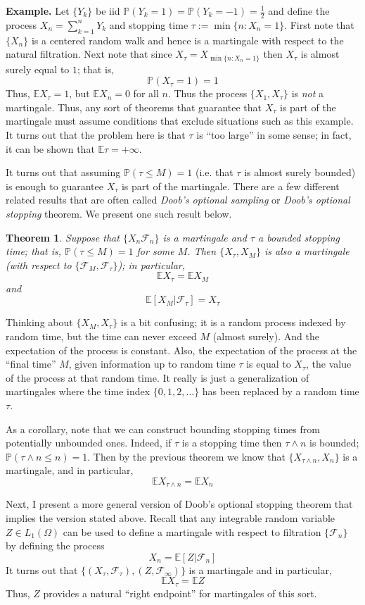 \documentclass[12pt]{article}
\newcommand{\E}{\mathbb{E}}
\newcommand{\Prob}{\mathbb{P}}
\newtheorem{thm}{Theorem}
\begin{document}
\bigskip
\textbf{Example.} Let $\{Y_k\}$ be iid $\Prob(Y_k = 1) = \Prob(Y_k = -1) = \frac{1}{2}$ and define the process 
$X_n = \sum_{k = 1}^{n} Y_k$ and stopping time $\tau := \min\{n: X_n = 1\}$. First note that $\{X_n\}$ is a centered random walk and hence is a martingale with respect 
to the natural filtration. 
Next note that since $X_\tau = X_{\min\{n: X_n = 1\}}$ then $X_\tau$ is almost surely equal to $1$; that is,
\[\Prob(X_\tau = 1) = 1\]
Thus, $\E X_\tau = 1$, but $\E X_n = 0$ for all $n$. Thus the process $\{X_1, X_\tau\}$ is \textit{not} a martingale.  
Thus, any sort of theorems that guarantee that $X_\tau$ is part of the martingale must assume conditions that exclude situations such as this example. It turns out that 
the problem here is that $\tau$ is ``too large'' in some sense; in fact, it can be shown that $\E \tau = +\infty$. 

It turns out that assuming $\Prob(\tau \leq M) = 1$ (i.e. that $\tau$ is almost surely bounded) is enough to guarantee $X_\tau$ is part of the martingale. There are a few different 
related results that are often called \textit{Doob's optional sampling} or \textit{Doob's optional stopping} theorem. We present one such result below. 
\begin{thm}
Suppose that $\{X_n \mathcal{F}_n\}$ is a martingale and $\tau$ a bounded stopping time; that is, $\Prob(\tau \leq M) = 1$ for some $M$. Then $\{X_\tau, X_M\}$ is also 
a martingale (with respect to $\{\mathcal{F}_M, \mathcal{F}_\tau\}$); in particular,
\[\E X_\tau = \E X_M\]
and 
\[\E[X_M|\mathcal{F}_\tau] = X_\tau\]
\end{thm}
Thinking about $\{X_M, X_\tau\}$ is a bit confusing; it is a random process indexed by random time, but the time can never exceed $M$ (almost surely). And the expectation 
of the process is constant. Also, the expectation of the process at the ``final time'' $M$, given information up to random time $\tau$ is equal to $X_\tau$, the value of the 
process at that random time. It really is just a generalization of martingales where the time index $\{0, 1, 2, \dots\}$ has been replaced by a random time $\tau$. 

As a corollary, note that we can construct bounding stopping times from potentially unbounded ones. Indeed, if $\tau$ is a stopping time then 
$\tau \wedge n$ is bounded; $\Prob(\tau \wedge n \leq n) = 1$. Then by the previous theorem we know that $\{X_{\tau \wedge n}, X_n\}$ is a martingale, and in particular, 
\[\E X_{\tau \wedge n} = \E X_n\]

Next, I present a more general version of Doob's optional stopping theorem that implies the version stated above. Recall that any integrable random variable 
$Z \in L_1(\Omega)$ can be used to define a martingale with respect to filtration $\{\mathcal{F}_n\}$ by defining the process
\[X_n = \E[Z|\mathcal{F}_n]\]
It turns out that $\{(X_\tau, \mathcal{F}_\tau), (Z, \mathcal{F}_\infty)\}$ is a martingale and in particular, 
\[\E X_\tau = \E Z\]
Thus, $Z$ provides a natural ``right endpoint'' for martingales of this sort. 
\end{document}
